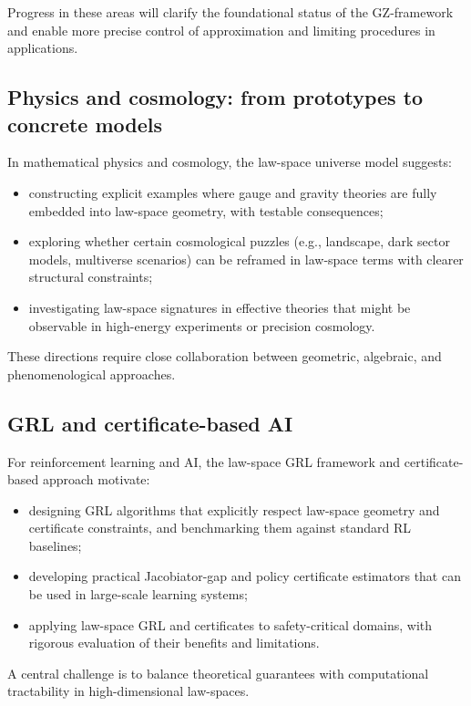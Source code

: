 \documentclass[11pt]{book}
\theoremstyle{plain}
\theoremstyle{definition}
\theoremstyle{remark}
\begin{document}
Progress in these areas will clarify the foundational status of the
GZ-framework and enable more precise control of approximation and
limiting procedures in applications.

\subsection*{Physics and cosmology: from prototypes to concrete models}

In mathematical physics and cosmology, the law-space universe model
suggests:
\begin{itemize}
  \item constructing explicit examples where gauge and gravity
        theories are fully embedded into law-space geometry, with
        testable consequences;
  \item exploring whether certain cosmological puzzles (e.g.,
        landscape, dark sector models, multiverse scenarios) can be
        reframed in law-space terms with clearer structural
        constraints;
  \item investigating law-space signatures in effective theories
        that might be observable in high-energy experiments or
        precision cosmology.
\end{itemize}

These directions require close collaboration between geometric,
algebraic, and phenomenological approaches.

\subsection*{GRL and certificate-based AI}

For reinforcement learning and AI, the law-space GRL framework and
certificate-based approach motivate:
\begin{itemize}
  \item designing GRL algorithms that explicitly respect law-space
        geometry and certificate constraints, and benchmarking them
        against standard RL baselines;
  \item developing practical Jacobiator-gap and policy certificate
        estimators that can be used in large-scale learning systems;
  \item applying law-space GRL and certificates to safety-critical
        domains, with rigorous evaluation of their benefits and
        limitations.
\end{itemize}

A central challenge is to balance theoretical guarantees with
computational tractability in high-dimensional law-spaces.
\end{document}
